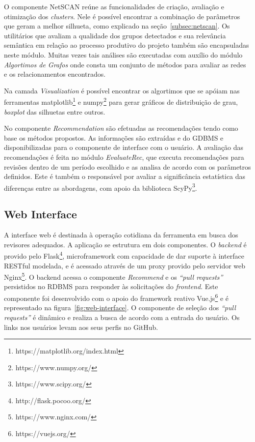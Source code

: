 \documentclass[12pt,openany,oneside,a4paper,english,brazil]{abntbibufjf}
\begin{document}
    O componente NetSCAN reúne as funcionalidades de criação, avaliação e otimização dos \textit{clusters}. Nele é possível encontrar a combinação de parâmetros que geram a melhor silhueta, como explicado na seção~\ref{subsec:netscan}. Os utilitários que avaliam a qualidade dos grupos detectados e sua relevância semântica em relação ao processo produtivo do projeto também são encapsuladas neste módulo. Muitas vezes tais análises são executadas com auxílio do módulo \textit{Algortimos de Grafos} onde consta um conjunto de métodos para avaliar as redes e os relacionamentos encontrados.

    Na camada \textit{Visualization} é possível encontrar os algortimos que se apóiam nas ferramentas matplotlib\footnote{https://matplotlib.org/index.html} e numpy\footnote{https://www.numpy.org/} para gerar gráficos de distribuição de grau, \textit{boxplot} das silhuetas entre outros.

    No componente \textit{Recommendation} são efetuadas as recomendações tendo como base os métodos propostos. As informações são extraídas e do GDBMS e disponibilizadas para o componente de interface com o usuário. A avaliação das recomendações é feita no módulo \textit{EvaluateRec}, que executa recomendações para revisões dentro de um período escolhido e as analisa de acordo com os parâmetros definidos. Este é também o responsável por avaliar a significância estatística das diferenças entre as abordagens, com apoio da biblioteca ScyPy\footnote{https://www.scipy.org/}.

    \subsection{Web Interface}

    A interface web é destinada à operação cotidiana da ferramenta em busca dos revisores adequados. A aplicação se estrutura em dois componentes. O \textit{backend} é provido pelo Flask\footnote{http://flask.pocoo.org/}, microframework com capacidade de dar suporte à interface RESTful modelada, e é acessado através de um proxy provido pelo servidor web Nginx\footnote{https://www.nginx.com/}. O backend acessa o componente \textit{Recommend} e os \textit{``pull requests''}  persistidos no RDBMS para responder às solicitações do \textit{frontend}. Este componente foi desenvolvido com o apoio do framework reativo Vue.js\footnote{https://vuejs.org/} e é representado na figura~\ref{fig:web-interface}. O componente de seleção dos \textit{``pull requests''} é dinâmico e realiza a busca de acordo com a entrada do usuário. Os links nos usuários levam aos seus perfis no GitHub.
\end{document}
